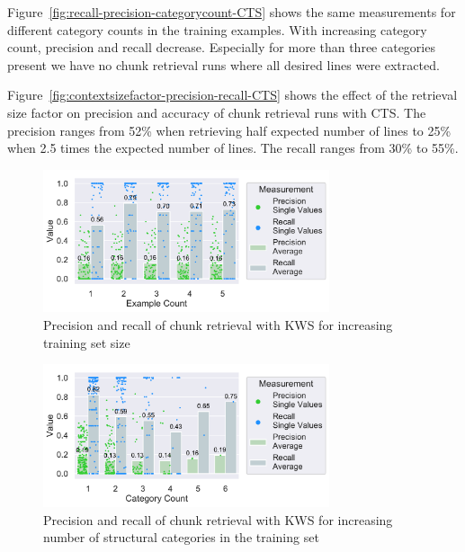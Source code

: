 \documentclass[\myrootdir/main.tex]{subfiles}
\begin{document}
Figure~\ref{fig:recall-precision-categorycount-CTS} shows the same measurements for different category counts in the training examples.
With increasing category count, precision and recall decrease.
Especially for more than three categories present we have no chunk retrieval runs where all desired lines were extracted.

Figure~\ref{fig:contextsizefactor-precision-recall-CTS} shows the effect of the retrieval size factor on precision and accuracy of chunk retrieval runs with CTS\@.
The precision ranges from 52\% when retrieving half expected number of lines to 25\% when 2.5 times the expected number of lines.
The recall ranges from 30\% to 55\%.


\begin{figure}[htbp]
		\centering
		\includegraphics[width=0.75\textwidth, clip]{img/big-study/recall-precision-examplecount-KWS.pdf}
		\caption{Precision and recall of chunk retrieval with KWS for increasing training set size}
		\label{fig:recall-precision-examplecount-KWS}
\end{figure}

\begin{figure}[htbp]
		\centering
		\includegraphics[width=0.75\textwidth, clip]{img/big-study/recall-precision-categorycount-KWS.pdf}
		\caption{Precision and recall of chunk retrieval with KWS for increasing number of structural categories in the training set}
		\label{fig:recall-precision-categorycount-KWS}
\end{figure}
\end{document}
